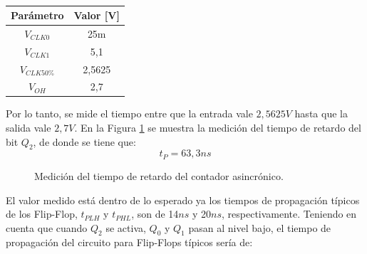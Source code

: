 %
\begin{table}[H]
\centering
\begin{tabular}{|c|c|}
\hline
\textbf{Par\'ametro} & \textbf{Valor {[}V{]}} \\ \hline
$V_{CLK0}$       & 25m                  \\ \hline
$V_{CLK1}$       & 5,1                    \\ \hline
$V_{CLK50\%}$    & 2,5625                 \\ \hline
$V_{OH}$         & 2,7                    \\ \hline
\end{tabular}
\caption{}
\label{ej7_tab:valores_medicion}
\end{table}
%
\noindent
 Por lo tanto, se mide el tiempo entre que la entrada vale $2,5625V$ hasta que la salida vale $2,7V$. En la Figura \ref{ej7_fig:asinc_measure1} se muestra la medici\'on del tiempo de retardo del bit $Q_2$, de donde se tiene que:
 \begin{equation*}
     t_P = 63,3ns
 \end{equation*} 
%
\begin{figure}[H]
	\centering
	\caption{Medici\'on del tiempo de retardo del contador asincr\'onico.}
	\label{ej7_fig:asinc_measure1}
\end{figure}
%
\noindent
El valor medido est\'a dentro de lo esperado ya los tiempos de propagaci\'on t\'ipicos de los Flip-Flop, $t_{PLH}$ y $t_{PHL}$, son de 14$ns$ y 20$ns$, respectivamente. Teniendo en cuenta que cuando $Q_2$ se activa, $Q_0$ y $Q_1$ pasan al nivel bajo, el tiempo de propagaci\'on del circuito para Flip-Flops t\'ipicos ser\'ia de:
